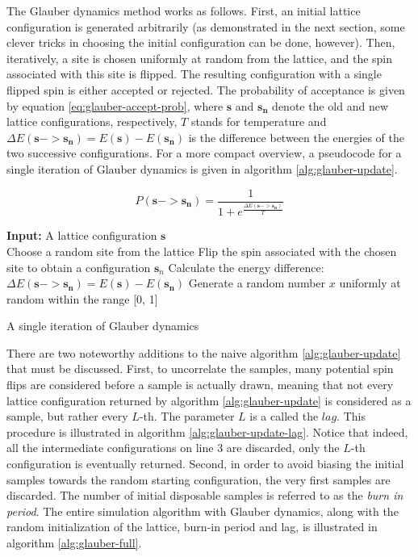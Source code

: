 \documentclass[12pt]{article}
\begin{document}
The Glauber dynamics method works as follows. First, an initial lattice configuration is generated arbitrarily (as demonstrated in the next section, some clever tricks in choosing the initial configuration can be done, however). Then, iteratively, a site is chosen uniformly at random from the lattice, and the spin associated with this site is flipped. The resulting configuration with a single flipped spin is either accepted or rejected. The probability of acceptance is given by equation \ref{eq:glauber-accept-prob}, where $\boldsymbol{s}$ and $\boldsymbol{s_n}$ denote the old and new lattice configurations, respectively, $T$ stands for temperature and $\Delta E(\boldsymbol{s} -> \boldsymbol{s_n}) = E(\boldsymbol{s}) - E(\boldsymbol{s_n})$ is the difference between the energies of the two successive configurations. For a more compact overview, a pseudocode for a single iteration of Glauber dynamics is given in algorithm \ref{alg:glauber-update}.

\begin{equation}
P(\boldsymbol{s} -> \boldsymbol{s_n}) = \frac{1}{1 + e^\frac{\Delta E(\boldsymbol{s} -> \boldsymbol{s_n})}{T}}
\label{eq:glauber-accept-prob}
\end{equation}

\begin{algorithm}
\textbf{Input:} A lattice configuration $\boldsymbol{s}$ \\
Choose a random site from the lattice\;
Flip the spin associated with the chosen site to obtain a configuration $\boldsymbol{s}_n$\;
Calculate the energy difference: $\Delta E(\boldsymbol{s} -> \boldsymbol{s_n}) = E(\boldsymbol{s}) - E(\boldsymbol{s_n})$\;
Generate a random number $x$ uniformly at random within the range [0, 1]\;
\caption{A single iteration of Glauber dynamics}
\label{alg:glauber-update}
\end{algorithm}

There are two noteworthy additions to the naive algorithm \ref{alg:glauber-update} that must be discussed. First, to uncorrelate the samples, many potential spin flips are considered before a sample is actually drawn, meaning that not every lattice configuration returned by algorithm \ref{alg:glauber-update} is considered as a sample, but rather every $L$-th. The parameter $L$ is a called the $lag$. This procedure is illustrated in algorithm \ref{alg:glauber-update-lag}. Notice that indeed, all the intermediate configurations on line $3$ are discarded,  only the $L$-th configuration is eventually returned. Second, in order to avoid biasing the initial samples towards the random starting configuration, the very first samples are discarded. The number of initial disposable samples is referred to as the \textit{burn in period}. The entire simulation algorithm with Glauber dynamics, along with the random initialization of the lattice, burn-in period and lag, is illustrated in algorithm \ref{alg:glauber-full}.
\end{document}

